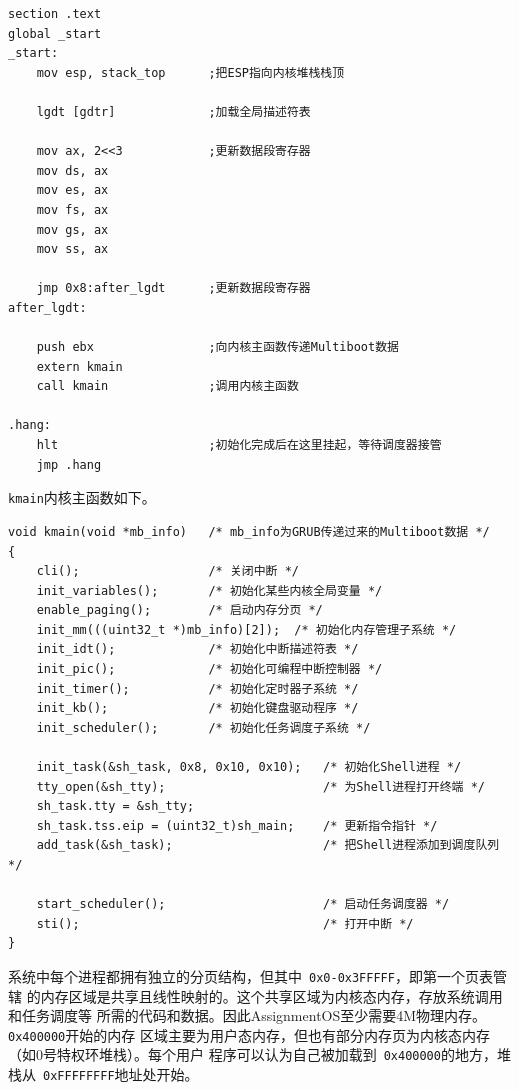 \documentclass[a4paper, adobefonts]{ctexart}
\begin{document}
\begin{verbatim}
section .text
global _start
_start:
    mov esp, stack_top      ;把ESP指向内核堆栈栈顶

    lgdt [gdtr]             ;加载全局描述符表

    mov ax, 2<<3            ;更新数据段寄存器
    mov ds, ax
    mov es, ax
    mov fs, ax
    mov gs, ax
    mov ss, ax

    jmp 0x8:after_lgdt      ;更新数据段寄存器
after_lgdt:

    push ebx                ;向内核主函数传递Multiboot数据
    extern kmain
    call kmain              ;调用内核主函数

.hang:
    hlt                     ;初始化完成后在这里挂起，等待调度器接管
    jmp .hang
\end{verbatim}

\verb|kmain|内核主函数如下。

\begin{verbatim}
void kmain(void *mb_info)   /* mb_info为GRUB传递过来的Multiboot数据 */
{
    cli();                  /* 关闭中断 */
    init_variables();       /* 初始化某些内核全局变量 */
    enable_paging();        /* 启动内存分页 */
    init_mm(((uint32_t *)mb_info)[2]);  /* 初始化内存管理子系统 */
    init_idt();             /* 初始化中断描述符表 */
    init_pic();             /* 初始化可编程中断控制器 */
    init_timer();           /* 初始化定时器子系统 */
    init_kb();              /* 初始化键盘驱动程序 */
    init_scheduler();       /* 初始化任务调度子系统 */

    init_task(&sh_task, 0x8, 0x10, 0x10);   /* 初始化Shell进程 */
    tty_open(&sh_tty);                      /* 为Shell进程打开终端 */
    sh_task.tty = &sh_tty;
    sh_task.tss.eip = (uint32_t)sh_main;    /* 更新指令指针 */
    add_task(&sh_task);                     /* 把Shell进程添加到调度队列 */

    start_scheduler();                      /* 启动任务调度器 */
    sti();                                  /* 打开中断 */
}
\end{verbatim}

系统中每个进程都拥有独立的分页结构，但其中~\verb|0x0-0x3FFFFF|，即第一个页表管辖
的内存区域是共享且线性映射的。这个共享区域为内核态内存，存放系统调用和任务调度等
所需的代码和数据。因此AssignmentOS至少需要4M物理内存。\verb|0x400000|开始的内存
区域主要为用户态内存，但也有部分内存页为内核态内存（如0号特权环堆栈）。每个用户
程序可以认为自己被加载到~\verb|0x400000|的地方，堆栈从~\verb|0xFFFFFFFF|地址处开始。
\end{document}

